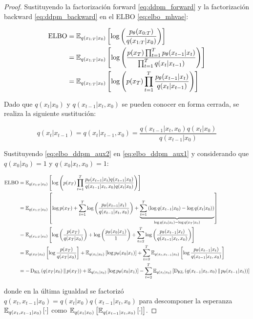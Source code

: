 \begin{proof}
    Sustituyendo la factorización forward \eqref{eq:ddpm_forward} y la factorización backward \eqref{eq:ddpm_backward} en el ELBO \eqref{eq:elbo_mhvae}:

    \begin{align}
        \operatorname{ELBO} &= \mathbb{E}_{q(x_{1:T}|x_0)}\left[\log\left(\frac{p_\theta(x_{0:T})}{q(x_{1:T}|x_0)}\right)\right]\nonumber\\
        &= \mathbb{E}_{q(x_{1:T}|x_0)}\left[\log\left(\frac{p(x_T)\prod_{t=1}^{T} p_\theta(x_{t-1}|x_t)}{\prod_{t=1}^{T} q(x_t|x_{t-1})}\right)\right]\nonumber\\
        &= \mathbb{E}_{q(x_{1:T}|x_0)}\left[\log\left(p(x_T)\prod_{t=1}^{T}\frac{p_\theta(x_{t-1}|x_t)}{q(x_t|x_{t-1})}\right)\right]\label{eq:elbo_ddpm_aux1}
    \end{align}

    Dado que $q(x_t|x_0)$ y $q(x_{t-1}|x_t,x_0)$ se pueden conocer en forma cerrada, se realiza la siguiente sustitución:

    \begin{equation}
        \label{eq:elbo_ddpm_aux2}
        q(x_t|x_{t-1}) = q(x_t|x_{t-1},x_0) = \frac{q(x_{t-1}|x_t,x_0)q(x_t|x_0)}{q(x_{t-1}|x_0)}
    \end{equation}

    Sustituyendo \eqref{eq:elbo_ddpm_aux2} en \eqref{eq:elbo_ddpm_aux1} y considerando que $q(x_0|x_0)=1$ y $q(x_0|x_t,x_0)=1$:

    \begin{align*}
        \operatorname{ELBO} &= \mathbb{E}_{q(x_{1:T}|x_0)}\left[\log\left(p(x_T)\prod_{t=1}^{T}\frac{p_\theta(x_{t-1}|x_t)q(x_{t-1}|x_0)}{q(x_{t-1}|x_t,x_0)q(x_t|x_0)}\right)\right]\\
        &= \mathbb{E}_{q(x_{1:T}|x_0)}\left[\log p(x_T) + \sum_{t=1}^T \log\left(\frac{p_\theta(x_{t-1}|x_t)}{q(x_{t-1}|x_t,x_0)}\right) + \underbrace{\sum_{t=1}^T \left(\log q(x_{t-1}|x_0)-\log q(x_t|x_0)\right)}_{\log q(x_0|x_0)-\log q(x_T|x_0)}\right]\\
        &= \mathbb{E}_{q(x_{1:T}|x_0)}\left[\log\left(\frac{p(x_T)}{q(x_T|x_0)}\right) + \log\left(\frac{p_\theta(x_0|x_1)}{1}\right) + \sum_{t=2}^T \log\left(\frac{p_\theta(x_{t-1}|x_t)}{q(x_{t-1}|x_t,x_0)}\right)\right]\\
        &= \mathbb{E}_{q(x_T|x_0)}\left[\log \frac{p(x_T)}{q(x_T|x_0)}\right] + \mathbb{E}_{q(x_1|x_0)}\left[\log p_\theta(x_0|x_1)\right] + \sum_{t=2}^T \mathbb{E}_{q(x_t,x_{t-1}|x_0)}\left[\log\frac{p_\theta(x_{t-1}|x_t)}{q(x_{t-1}|x_t,x_0)}\right]\\
        &= -\operatorname{D_{KL}}\left(q(x_T|x_0)\,\|\,p(x_T)\right) + \mathbb{E}_{q(x_1|x_0)}\left[\log p_\theta(x_0|x_1)\right] - \sum_{t=2}^T \mathbb{E}_{q(x_t|x_0)}\left[\operatorname{D_{KL}}\left(q(x_{t-1}|x_t,x_0)\,\|\,p_\theta(x_{t-1}|x_t)\right)\right]
    \end{align*}

    donde en la última igualdad se factorizó $q(x_t,x_{t-1}|x_0)=q(x_t|x_0)q(x_{t-1}|x_t,x_0)$ para descomponer la esperanza $\mathbb{E}_{q(x_t,x_{t-1}|x_0)}\left[\cdot\right]$ como $\mathbb{E}_{q(x_t|x_0)}\left[\mathbb{E}_{q(x_{t-1}|x_t,x_0)}\left[\cdot\right]\right]$.
\end{proof}


